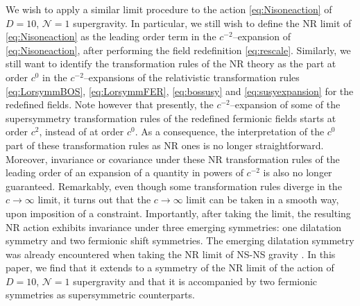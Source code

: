 \documentclass[a4paper,10pt,openany]{article}
\begin{document}
	We wish to apply a similar limit procedure to the action \eqref{eq:Nisoneaction} of $D=10$, $\mathcal{N}=1$ supergravity. In particular, we still wish to define the NR limit of \eqref{eq:Nisoneaction} as the leading order term in the $c^{-2}$--expansion of \eqref{eq:Nisoneaction}, after performing the field redefinition \eqref{eq:rescale}. Similarly, we still want to identify the transformation rules of the NR theory as the part at order $c^0$ in the $c^{-2}$--expansions of the relativistic transformation rules \eqref{eq:LorsymmBOS}, \eqref{eq:LorsymmFER}, \eqref{eq:bossusy} and \eqref{eq:susyexpansion} for the redefined fields. Note however that presently, the $c^{-2}$--expansion of some of the supersymmetry transformation rules of the redefined fermionic fields starts at order $c^2$, instead of at order $c^0$. As a consequence, the interpretation of the $c^0$ part of these transformation rules as NR ones is no longer straightforward. Moreover, invariance or covariance under these NR transformation rules of the leading order of an expansion of a quantity in powers of $c^{-2}$ is also no longer guaranteed. Remarkably, even though some transformation rules diverge in the $c\rightarrow \infty$ limit, it turns out that the $c\rightarrow \infty$ limit can be taken in a smooth way, upon imposition of a constraint. Importantly, after taking the limit, the resulting NR action exhibits invariance under three emerging symmetries: one dilatation symmetry and two fermionic shift symmetries. The emerging dilatation symmetry was already encountered when taking the NR limit of NS-NS gravity \cite{Bergshoeff:2021bmc}. In this paper, we find that it extends to a symmetry of the NR limit of the action of $D=10$, $\mathcal{N}=1$ supergravity and that it is accompanied by two fermionic symmetries as supersymmetric counterparts.
	
\end{document}
